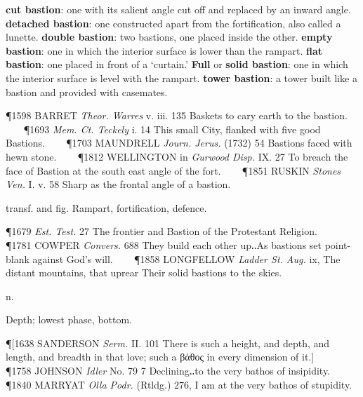 \begin{description}[wide, labelwidth=!, labelindent=0pt]
\begin{myenumerate}
\textbf{cut bastion}: one with its salient angle cut off and replaced by an
inward angle. 
\textbf{detached bastion}: one constructed apart from the
fortification, also called a lunette. 
\textbf{double bastion}: two bastions, one placed inside the other. 
\textbf{empty bastion}: one in which the interior surface is lower than the rampart. 
\textbf{flat bastion}: one placed in front of a ‘curtain.’ 
\textbf{Full} or \textbf{solid bastion}: one in which the interior surface is level with the rampart. 
\textbf{tower bastion}: a tower built like a bastion and provided with casemates.

\P 1598 BARRET  \textit{Theor. Warres} v. iii. 135 Baskets to cary earth to the bastion.    
\P 1693 \textit{Mem. Ct. Teckely} i. 14 This small City, flanked with five good Bastions.    
\P 1703 MAUNDRELL  \textit{Journ. Jerus.} (1732) 54 Bastions faced with hewn stone.    
\P 1812 WELLINGTON in \textit{Gurwood Disp.} IX. 27 To breach the face of Bastion at the south east angle of the fort.    
\P 1851 RUSKIN  \textit{Stones Ven.} I. v. 58 Sharp as the frontal angle of a bastion.

 transf. and fig. Rampart, fortification, defence.

\P 1679 \textit{Est. Test.} 27 The frontier and Bastion of the Protestant Religion.    
\P 1781 COWPER  \textit{Convers.} 688 They build each other up‥As bastions set point-blank against God's will.    
\P 1858 LONGFELLOW  \textit{Ladder St. Aug.} ix, The distant mountains, that uprear Their solid bastions to the skies.
\end{myenumerate}


 n.

\noindent {}

\vspace{-0.3cm}

\begin{myenumerate}

 Depth; lowest phase, bottom.

\P [1638 SANDERSON  \textit{Serm.} II. 101 There is such a height, and depth, and length, and breadth in that love; such a βάθος in every dimension of it.]    
\P 1758 JOHNSON  \textit{Idler} No. 79 7 Declining‥to the very bathos of insipidity.    
\P 1840 MARRYAT  \textit{Olla Podr.} (Rtldg.) 276, I am at the very bathos of stupidity.


\end{myenumerate}
\end{description}
